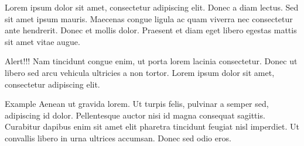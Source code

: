 \documentclass[compress]{beamer}
\begin{document}
  \begin{frame}{}
    \begin{theorem}
Lorem ipsum dolor sit amet, consectetur adipiscing elit. Donec a diam lectus. Sed sit amet ipsum mauris. Maecenas congue ligula ac quam viverra nec consectetur ante hendrerit. Donec et mollis dolor. Praesent et diam eget libero egestas mattis sit amet vitae augue. 
    \end{theorem}

  \begin{alertblock}{Alert!!!}
Nam tincidunt congue enim, ut porta lorem lacinia consectetur. Donec ut libero sed arcu vehicula ultricies a non tortor. Lorem ipsum dolor sit amet, consectetur adipiscing elit. 
  \end{alertblock}

  \begin{exampleblock}{Example}
Aenean ut gravida lorem. Ut turpis felis, pulvinar a semper sed, adipiscing id dolor. Pellentesque auctor nisi id magna consequat sagittis. Curabitur dapibus enim sit amet elit pharetra tincidunt feugiat nisl imperdiet. Ut convallis libero in urna ultrices accumsan. Donec sed odio eros.
  \end{exampleblock}
  \end{frame}
\end{document}
